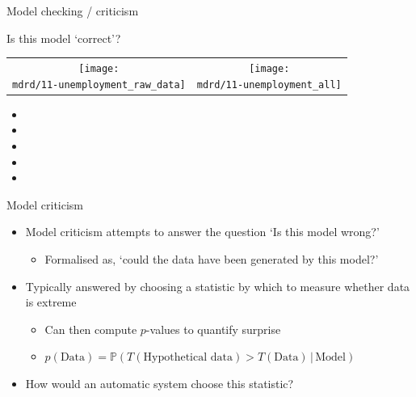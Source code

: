 \begin{frame}{Model checking / criticism}
  
\end{frame}

\begin{frame}{Is this model `correct'?}
\newcommand{\wmgd}{0.5\columnwidth}
\newcommand{\hmgd}{3.0cm}
\newcommand{\mdrd}{../figures/11-unemployment}
\newcommand{\mbm}{\hspace{-0.3cm}}
\begin{tabular}{cc}
\mbm \texttt{[image: \\mdrd/11-unemployment\_raw\_data]} & \texttt{[image: \\mdrd/11-unemployment\_all]}
\end{tabular}

{\footnotesize
\begin{itemize}

  \item  

  \item  

  \item  

  \item  

  \item  

\end{itemize}
}
\end{frame}

\begin{frame}{Model criticism}
  \begin{itemize}
    \item Model criticism attempts to answer the question `Is this model wrong?'
    \begin{itemize}
      \item Formalised as, `could the data have been generated by this model?'
    \end{itemize}
    \vspace{\baselineskip}
    \item Typically answered by choosing a statistic by which to measure whether data is extreme
    \begin{itemize}
      \item Can then compute $p$-values to quantify surprise
      \item $p(\textrm{Data}) = \mathbb{P}(T(\textrm{Hypothetical data}) > T(\textrm{Data}) \,|\, \textrm{Model})$
    \end{itemize}
    \vspace{\baselineskip}
    \item How would an automatic system choose this statistic?
  \end{itemize}
\end{frame}

